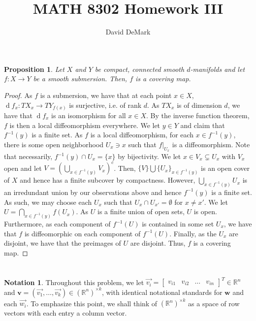 \documentclass[english]{article}
\title{MATH 8302 Homework III}
\author{David DeMark}
\date{\due}
\let\avec=\vec
\renewcommand\vec{\mathbf}
\renewcommand{\d}[1]{\ensuremath{\operatorname{d}\!{#1}}}
\newcommand{\evat}[3]{\left. #1\right|_{#2}^{#3}}
\newcommand{\restr}[2]{\evat{#1}{#2}{}}
\newcommand{\RR}{\mathbb{R}}
\newcommand{\prob}[1]{\setcounter{section}{#1-1}\section{}}
\newcommand{\prt}[1]{\setcounter{subsection}{#1-1}\subsection{}}
\newtheorem*{proposition*}{Proposition}
\theoremstyle{remark}
\theoremstyle{definition}
\newtheorem{notation}[theorem]{Notation}
\begin{document}
\maketitle
\prob{1} \begin{proposition*}
	Let $X$ and $Y$ be compact, connected smooth $d$-manifolds and let $f:X\to Y$ be a smooth submersion. Then, $f$ is a covering map. 
\end{proposition*}
\begin{proof}
As $f$ is a submersion, we have that at each point $x\in X$, $\d f_x: TX_x\to TY_{f(x)} $ is surjective, i.e. of rank $d$. As $TX_x$ is of dimension $d$, we have that $\d f_x$ is an isomorphism for all $x\in X$. By the inverse function theorem, $f$ is then a local diffeomorphism everywhere. We let $y\in Y$ and claim that $f^{-1}(y)$ is a finite set. As $f$ is a local diffeomorphism, for each $x\in f^{-1}(y)$, there is some open neighborhood $U_x\ni x$ such that $\restr{f}{U_x}$ is a diffeomorphism. Note that necessarily, $f^{-1}(y)\cap U_x=\{x\}$ by bijectivity. We let $x\in V_x\subsetneq U_x$ with $V_x$ open and let $V=(\bigcup_{x\in f^{-1}(y)}V_x)^c$. Then, $\{V\}\bigcup \{U_x\}_{x\in f^{-1}(y)}$ is an open cover of $X$ and hence has a finite subcover by compactness. However, $\bigcup_{x\in f^{-1}(y)}U_x$ is an irredundant union by our observations above and hence $f^{-1}(y)$ is a finite set. As such, we may choose each $U_x$ such that $U_x\cap U_{x'}=\emptyset$ for $x\neq x'$. We let $U=\bigcap_{x\in f^{-1}(y)}f(U_x)$. As $U$ is a finite union of open sets, $U$ is open. Furthermore, as each component of $f^{-1}(U)$ is contained in some set $U_x$, we have that $f$ is diffeomorphic on each component of $f^{-1}(U)$. Finally, as the $U_x$ are disjoint, we have that the preimages of $U$ are disjoint. Thus, $f$ is a covering map.
\end{proof}
\prob{2}
\begin{notation}
	
		Throughout this problem, we let $\avec{v_i}=\begin{bmatrix}
		v_{i1}&v_{i2}&\dots&v_{in}
		\end{bmatrix}^T\in \RR^n$ and $\vec{v}=(\avec{v_1},\dots,\avec{v_k})\in (\RR^n)^{\times k}$, with identical notational standards for $\vec{w}$ and each $\avec{w_i}$. To emphasize this point, we shall think of $(\RR^n)^{\times k}$ as a space of row vectors with each entry a column vector.
\end{notation}
\prt{1}
\end{document}
